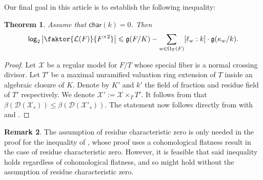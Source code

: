 \documentclass[a4paper,12pt,reqno]{amsart}
\newcommand\mc\mathcal
\newtheorem{thm}{Theorem}[section]
\theoremstyle{definition}
\newtheorem{rem}[thm]{Remark}
\numberwithin{equation}{thm}
\renewcommand{\leq}{\leqslant}
\renewcommand{\log}{\mathsf{log}}
\begin{document}
Our final goal in this article is to establish  the following inequality:

\begin{thm}\label{boundlocal}
Assume that $\mathsf{char}(k)=0$. Then
$$\log_2\left|\faktor{\mathcal{L}(F)}{F^{\times 2}}\right|\leq \mathfrak{g}(F/K) - \sum_{w \in \Omega_T(F)} [\ell_w:k]\cdot \mathfrak{g}(\kappa_w/k).$$
\end{thm}
\begin{proof}
Let $\mc{X}$ be a regular model for $F/T$ whose special fiber is a normal crossing divisor. Let $T'$ be a maximal unramified valuation ring extension of $T$ inside an algebraic closure of $K$. Denote by $K'$ and $k'$ the  field of fraction and residue field of $T'$ respectively. We denote 
$\mc{X}':= \mc{X} \times_T T'$. It follows from  that $\beta(\mc{D}(\mc{X}_s))\leq \beta(\mc{D}(\mc{X'}_s)).$
The statement now follows directly from  with  and . 
\end{proof}

\begin{rem}
The assumption of residue characteristic zero is only needed in the proof for the inequality of , whose proof uses a cohomological flatness result in the case of residue characteristic zero. However, it is feasible that said inequality holds regardless of cohomological flatness, and so  might hold without the assumption of residue characteristic zero.
\end{rem}

\end{document}

